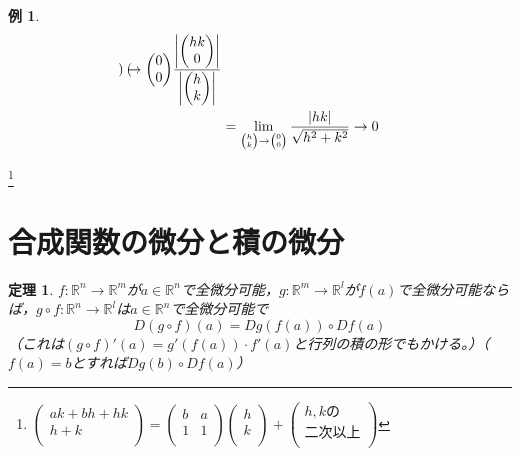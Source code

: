 \documentclass[dvipdfmx,a4j,10pt]{jsarticle}
\theoremstyle{mystyle1}
\newtheorem{thm}[dfn]{定理}
\theoremstyle{mystyle2}
\newtheorem{example}{例}
\begin{document}
\begin{example}
\[\begin{split}
{\begin{pmatrix}
\end{pmatrix}
\to
\begin{pmatrix}
0 \\
0 \\
\end{pmatrix}}
\frac{\left|
\begin{pmatrix}
hk \\
0 \\
\end{pmatrix}
\right|}{\left|
\begin{pmatrix}
h \\
k \\
\end{pmatrix}
\right|}
\\
&=
\lim_{
\tiny
\begin{pmatrix}
h \\
k \\
\end{pmatrix}
\to
\begin{pmatrix}
0 \\
0 \\
\end{pmatrix}}
\frac{|hk|}{\sqrt{h^2+k^2}}\to0
\end{split}
\]
\end{example}
\footnote{
$
\begin{pmatrix}
ak+bh+hk \\
h+k \\
\end{pmatrix}
=
\begin{pmatrix}
b & a \\
1 & 1\\
\end{pmatrix}
\begin{pmatrix}
h \\
k \\
\end{pmatrix}
+
\begin{pmatrix}
h,kの\\
二次以上 \\
\end{pmatrix}
$
}



\newpage


\section{合成関数の微分と積の微分}

\begin{framed}
	\begin{thm}\label{th2.2}
		$f:\mathbb{R}^n\to\mathbb{R}^m$が$a\in\mathbb{R}^n$で全微分可能，$g:\mathbb{R}^m\to\mathbb{R}^l$が$f(a)$で全微分可能ならば，$g\circ f:\mathbb{R}^n\to\mathbb{R}^l$は$a\in\mathbb{R}^n$で全微分可能で
		\[
		D(g\circ f)(a)=Dg(f(a))\circ Df(a)
		\]
		（これは$(g\circ f)'(a)=g'(f(a))\cdot f'(a)$と行列の積の形でもかける。）（$f(a)=b$とすれば$Dg(b)\circ Df(a)$）
	\end{thm}
\end{framed}
\end{document}
